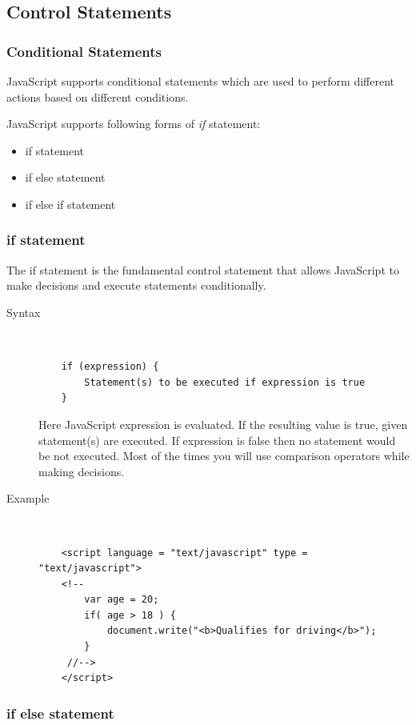 \documentclass[11pt,a4paper]{article}
\begin{document}
\subsection{Control Statements}
\subsubsection*{Conditional Statements}

JavaScript supports conditional statements which are used to perform different actions based on different conditions.

JavaScript supports following forms of \emph{if} statement:
\begin{itemize}
\item if statement
\item if else statement
\item if else if statement
\end{itemize}

\subsubsection*{if statement}
The if statement is the fundamental control statement that allows JavaScript to make decisions and execute statements conditionally.
\begin{description}
\item[Syntax]\
\begin{verbatim}
    if (expression) {
        Statement(s) to be executed if expression is true
    }
\end{verbatim}

Here JavaScript expression is evaluated. If the resulting value is true, given statement(s) are executed. If expression is false then no statement would be not executed. Most of the times you will use comparison operators while making decisions.

\pagebreak
\item[Example]\
\begin{verbatim}
    <script language = "text/javascript" type = "text/javascript">
    <!--
        var age = 20;
        if( age > 18 ) {
            document.write("<b>Qualifies for driving</b>");
        }
     //-->
    </script>
\end{verbatim}
\end{description}

\subsubsection*{if else statement}
\end{document}
